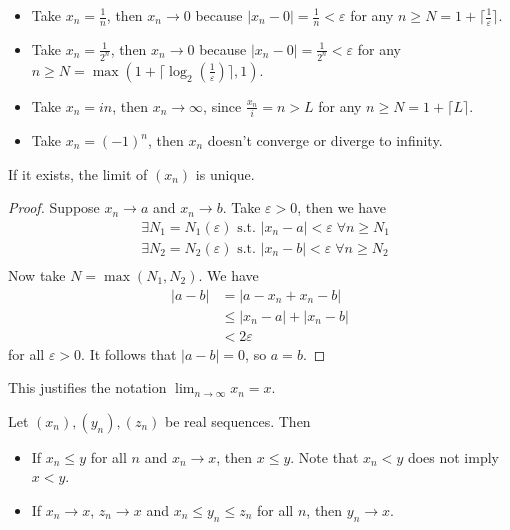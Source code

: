 \documentclass{../../template/note}
\begin{document}
    \begin{example}
        \begin{itemize}
            \item Take \(x_n = \frac{1}{n}\), then \(x_n \to 0\) because \(|x_n - 0| = \frac{1}{n} < \varepsilon\) for any \(n \geq N = 1 + \lceil \frac{1}{\varepsilon} \rceil\).
            \item Take \(x_n = \frac{1}{2^n}\), then \(x_n \to 0\) because \(|x_n - 0| = \frac{1}{2^n} < \varepsilon\) for any \(n \geq N = \max(1 + \lceil \log_2(\frac{1}{\varepsilon}) \rceil, 1)\).
            \item Take \(x_n = in\), then \(x_n \to \infty\), since \(\frac{x_n}{i} = n > L\) for any \(n \geq N = 1 + \lceil L \rceil\).
            \item Take \(x_n = (-1)^n\), then \(x_n\) doesn't converge or diverge to infinity.
        \end{itemize}
    \end{example}
    
    \begin{lemma}
        If it exists, the limit of \((x_n)\) is unique.
    \end{lemma}
    
    \begin{proof}
        Suppose \(x_n \to a\) and \(x_n \to b\). Take \(\varepsilon > 0\), then we have
        \begin{align*}
            &\exists N_1 = N_1(\varepsilon) \text{ s.t. } |x_n - a| < \varepsilon \; \forall n \geq N_1 \\
            &\exists N_2 = N_2(\varepsilon) \text{ s.t. } |x_n - b| < \varepsilon \; \forall n \geq N_2 \\
        \end{align*}
        Now take \(N = \max(N_1, N_2)\). We have
        \begin{align*}
            |a-b| &= |a-x_n+x_n-b| \\
            &\leq |x_n-a|+|x_n-b| \\
            &< 2\varepsilon
        \end{align*}
        for all \(\varepsilon > 0\). It follows that \(|a-b| = 0\), so \(a=b\).
    \end{proof}
    
    This justifies the notation \(\lim_{n \to \infty} x_n = x\).

    \begin{proposition}
        Let \((x_n), (y_n), (z_n)\) be real sequences. Then
        \begin{itemize}
            \item If \(x_n \leq y\) for all \(n\) and \(x_n \to x\), then \(x \leq y\). Note that \(x_n < y\) does not imply \(x < y\).
            \item If \(x_n \to x\), \(z_n \to x\) and \(x_n \leq y_n \leq z_n\) for all \(n\), then \(y_n \to x\).
        \end{itemize}
    \end{proposition}
    
\end{document}
